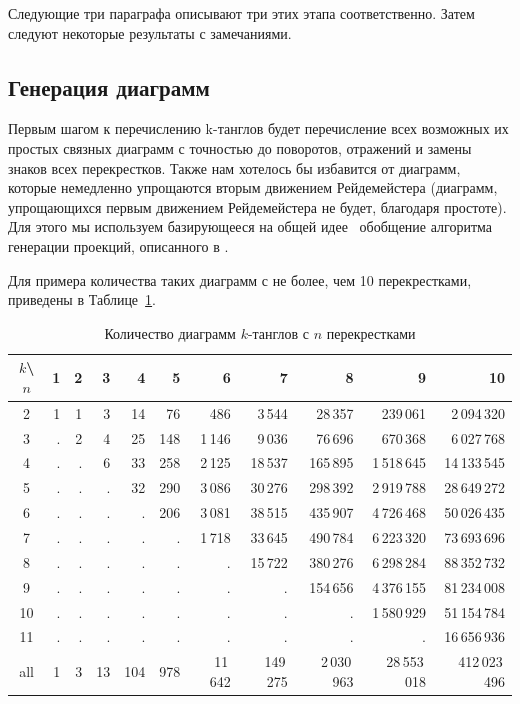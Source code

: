 \documentclass[12pt]{article}
\theoremstyle{plain}
\theoremstyle{definition}
\begin{document}
		Следующие три параграфа описывают три этих этапа соответственно. Затем следуют некоторые результаты с замечаниями.

	\subsection{Генерация диаграмм}

		Первым шагом к перечислению k-танглов будет перечисление всех возможных их простых связных диаграмм с точностью до поворотов, отражений
		и замены знаков всех перекрестков. Также нам хотелось бы избавится от диаграмм, которые немедленно упрощаются вторым движением
		Рейдемейстера (диаграмм, упрощающихся первым движением Рейдемейстера не будет, благодаря простоте). Для этого мы используем
		базирующееся на общей идее~\cite{McKay1998} обобщение алгоритма генерации проекций, описанного в \cite{BogdanovMeshkovOmelchenkoPetrov2011}.

		Для примера количества таких диаграмм с не более, чем 10 перекрестками, приведены в Таблице~\ref{table:tangle-diagrams}.

		\begin{table}[ht]
			\caption{Количество диаграмм $k$-танглов с $n$ перекрестками\label{table:tangle-diagrams}}
			\centering
			\begin{tabular}{|c||r|r|r|r|r|r|r|r|r|r|}
			\hline
			$k$\textbackslash $n$
			    & 1 & 2 &  3 &   4 &   5 &       6 &        7 &           8 &            9 &            10 \\
			\hline\hline
			2   & 1 & 1 &  3 &  14 &  76 &     486 &   3\,544 &     28\,357 &     239\,061 &   2\,094\,320 \\
			3   & . & 2 &  4 &  25 & 148 &  1\,146 &   9\,036 &     76\,696 &     670\,368 &   6\,027\,768 \\
			4   & . & . &  6 &  33 & 258 &  2\,125 &  18\,537 &    165\,895 &  1\,518\,645 &  14\,133\,545 \\
			5   & . & . &  . &  32 & 290 &  3\,086 &  30\,276 &    298\,392 &  2\,919\,788 &  28\,649\,272 \\
			6   & . & . &  . &   . & 206 &  3\,081 &  38\,515 &    435\,907 &  4\,726\,468 &  50\,026\,435 \\
			7   & . & . &  . &   . &   . &  1\,718 &  33\,645 &    490\,784 &  6\,223\,320 &  73\,693\,696 \\
			8   & . & . &  . &   . &   . &       . &  15\,722 &    380\,276 &  6\,298\,284 &  88\,352\,732 \\
			9   & . & . &  . &   . &   . &       . &        . &    154\,656 &  4\,376\,155 &  81\,234\,008 \\
			10  & . & . &  . &   . &   . &       . &        . &           . &  1\,580\,929 &  51\,154\,784 \\
			11  & . & . &  . &   . &   . &       . &        . &           . &            . &  16\,656\,936 \\
			\hline
			all & 1 & 3 & 13 & 104 & 978 & 11\,642 & 149\,275 & 2\,030\,963 & 28\,553\,018 & 412\,023\,496 \\
			\hline
			\end{tabular}
		\end{table}
\end{document}
